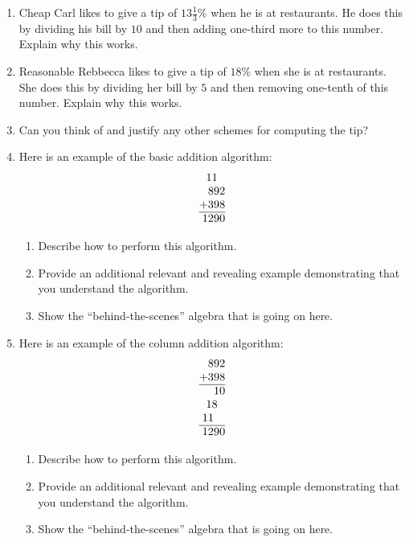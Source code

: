 \begin{problems}
\begin{enumerate}
\item Cheap Carl likes to give a tip of $13\frac{1}{3}$\% when he is
  at restaurants. He does this by dividing his bill by $10$ and then
  adding one-third more to this number. Explain why this works.
\item Reasonable Rebbecca likes to give a tip of $18$\% when she is at
  restaurants. She does this by dividing her bill by $5$ and then
  removing one-tenth of this number. Explain why this works.
\item Can you think of and justify any other schemes for computing the
  tip?
\item Here is an example of the basic addition algorithm:
\[
\begin{array}{@{}r@{}}
11~~\\
892\\
+398\\ \hline
1290
\end{array}
\]
\begin{enumerate}
\item Describe how to perform this algorithm.
\item Provide an additional relevant and revealing example
  demonstrating that you understand the algorithm.
\item Show the ``behind-the-scenes'' algebra that is going on here.
\end{enumerate}
\item Here is an example of the column addition
  algorithm:
\[
\begin{array}{@{}r@{}}
892\\
+398\\ \hline
10\\
18~~\\
11~~~\\ \hline
1290
\end{array}
\]
\begin{enumerate}
\item Describe how to perform this algorithm.
\item Provide an additional relevant and revealing example
  demonstrating that you understand the algorithm.
\item Show the ``behind-the-scenes'' algebra that is going on here.
\end{enumerate}


\end{enumerate}
\end{problems}
